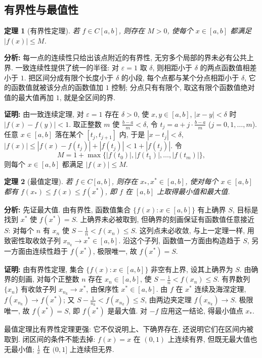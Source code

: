 \documentclass[UTF8,openany]{ctexbook}
\theoremstyle{chinesetextbook}
\newtheorem{theorem}{定理}[section]
\newenvironment{cnproof}{\par\indent\textbf{证明:} \ignorespaces}{\par}
\begin{document}
\subsection{有界性与最值性}
\begin{theorem}[有界性定理]
若 $f\in C[a,b]$, 则存在 $M>0$, 使每个 $x\in[a,b]$ 都满足 $|f(x)|\le M$.
\end{theorem}
\par\indent\textbf{分析:} 每一点的连续性只给出该点附近的有界性, 无穷多个局部的界未必有公共上界. 一致连续性提供了统一的半径: 对 $\varepsilon=1$ 取 $\delta$, 则相距小于 $\delta$ 的两点函数值相差小于 $1$. 把区间分成有限个长度小于 $\delta$ 的小段, 每个点都与某个分点相距小于 $\delta$, 它的函数值就被该分点的函数值加 $1$ 控制; 分点只有有限个, 取这有限个函数值绝对值的最大值再加 $1$, 就是全区间的界.
\begin{cnproof}
由一致连续定理, 对 $\varepsilon=1$ 存在 $\delta>0$, 使 $x,y\in[a,b]$, $|x-y|<\delta$ 时 $|f(x)-f(y)|<1$. 取正整数 $m$ 使 $\displaystyle\frac{b-a}m<\delta$, 令 $\displaystyle t_j=a+j\cdot\frac{b-a}m$ ($j=0,1,\ldots,m$). 任意 $x\in[a,b]$ 落在某个 $[t_{j},t_{j+1}]$ 内, 于是 $|x-t_j|<\delta$, $|f(x)|\le|f(x)-f(t_j)|+|f(t_j)|<1+|f(t_j)|$. 令
\[
M=1+\max\{|f(t_0)|,|f(t_1)|,\ldots,|f(t_m)|\},
\]
则每个 $x\in[a,b]$ 都满足 $|f(x)|\le M$.
\end{cnproof}
\begin{theorem}[最值定理]
若 $f\in C[a,b]$, 则存在 $x_*,x^*\in[a,b]$, 使对每个 $x\in[a,b]$ 都有 $f(x_*)\le f(x)\le f(x^*)$, 即 $f$ 在 $[a,b]$ 上取得最小值和最大值.
\end{theorem}
\par\indent\textbf{分析:} 先证最大值. 由有界性, 函数值集合 $\{f(x):x\in[a,b]\}$ 有上确界 $S$, 目标是找到 $x^*$ 使 $f(x^*)=S$. 上确界未必被取到, 但确界的刻画保证有函数值任意接近 $S$: 对每个 $n$ 有 $x_n$ 使 $\displaystyle S-\frac1n<f(x_n)\le S$. 这列点未必收敛, 与上一定理一样, 用致密性取收敛子列 $x_{n_k}\to x^*\in[a,b]$. 沿这个子列, 函数值一方面由构造趋于 $S$, 另一方面由连续性趋于 $f(x^*)$, 极限唯一, 故 $f(x^*)=S$.
\begin{cnproof}
由有界性定理, 集合 $\{f(x):x\in[a,b]\}$ 非空有上界, 设其上确界为 $S$. 由确界的刻画, 对每个正整数 $n$ 存在 $x_n\in[a,b]$, 使 $\displaystyle S-\frac1n<f(x_n)\le S$. 有界数列 $\{x_n\}$ 有收敛子列 $x_{n_k}\to x^*$, 由保序性 $x^*\in[a,b]$. 由 $f$ 在 $x^*$ 连续及海涅定理, $f(x_{n_k})\to f(x^*)$; 又 $\displaystyle S-\frac1{n_k}<f(x_{n_k})\le S$, 由两边夹定理 $f(x_{n_k})\to S$. 极限唯一, 故 $f(x^*)=S$, 即 $f(x^*)$ 是最大值. 对 $-f$ 应用这一结论, 得最小值点 $x_*$.
\end{cnproof}
最值定理比有界性定理更强: 它不仅说明上、下确界存在, 还说明它们在区间内被取到. 闭区间的条件不能去掉: $f(x)=x$ 在 $(0,1)$ 上连续有界, 但既无最大值也无最小值; $\displaystyle\frac1x$ 在 $(0,1]$ 上连续但无界.
\end{document}
